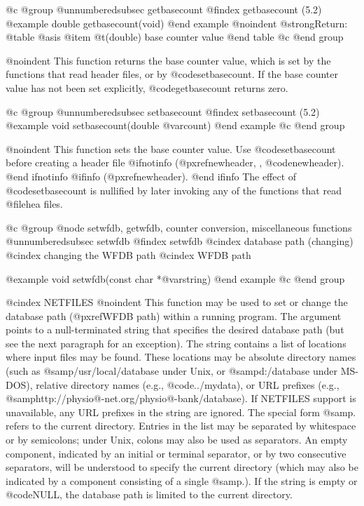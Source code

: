 {{{{{{{{@c @group
@unnumberedsubsec getbasecount
@findex getbasecount (5.2)
@example
double getbasecount(void)
@end example
@noindent
@strong{Return:}
@table @asis
@item @t{(double)}
base counter value
@end table
@c @end group

@noindent
This function returns the base counter value, which is set by the
functions that read header files, or by @code{setbasecount}.
If the base counter value has not been set explicitly,
@code{getbasecount} returns zero.

@c @group
@unnumberedsubsec setbasecount
@findex setbasecount (5.2)
@example
void setbasecount(double @var{count})
@end example
@c @end group

@noindent
This function sets the base counter value.  Use @code{setbasecount}
before creating a header file
@ifnotinfo
(@pxref{newheader, , @code{newheader}}).
@end ifnotinfo
@ifinfo
(@pxref{newheader}).
@end ifinfo
The effect of @code{setbasecount} is nullified by later invoking any of the
functions that read @file{hea} files.

@c @group
@node     setwfdb, getwfdb, counter conversion, miscellaneous functions
@unnumberedsubsec setwfdb
@findex setwfdb
@cindex database path (changing)
@cindex changing the WFDB path
@cindex WFDB path

@example
void setwfdb(const char *@var{string})
@end example
@c @end group

@cindex NETFILES
@noindent
This function may be used to set or change the database path
(@pxref{WFDB path}) within a running program.  The argument points to a
null-terminated string that specifies the desired database path (but see
the next paragraph for an exception).  The string contains a list of
locations where input files may be found.  These locations may be
absolute directory names (such as @samp{/usr/local/database} under Unix,
or @samp{d:/database} under MS-DOS), relative directory names (e.g.,
@code{../mydata}), or URL prefixes (e.g.,
@samp{http://physio@-net.org/physio@-bank/database}).  If NETFILES
support is unavailable, any URL prefixes in the string are ignored.  The
special form @samp{.} refers to the current directory.  Entries in the
list may be separated by whitespace or by semicolons; under Unix, colons
may also be used as separators.  An empty component, indicated by an
initial or terminal separator, or by two consecutive separators, will be
understood to specify the current directory (which may also be indicated
by a component consisting of a single @samp{.}).  If the string is empty or
@code{NULL}, the database path is limited to the current directory.

}}}}}}}}

